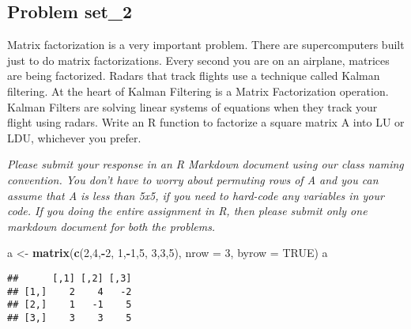 \documentclass[]{article}
\newenvironment{Shaded}{\begin{snugshade}}{\end{snugshade}}
\newcommand{\DataTypeTok}[1]{\textcolor[rgb]{0.13,0.29,0.53}{#1}}
\newcommand{\DecValTok}[1]{\textcolor[rgb]{0.00,0.00,0.81}{#1}}
\newcommand{\KeywordTok}[1]{\textcolor[rgb]{0.13,0.29,0.53}{\textbf{#1}}}
\newcommand{\NormalTok}[1]{#1}
\newcommand{\OperatorTok}[1]{\textcolor[rgb]{0.81,0.36,0.00}{\textbf{#1}}}
\newcommand{\OtherTok}[1]{\textcolor[rgb]{0.56,0.35,0.01}{#1}}
\newcommand{\StringTok}[1]{\textcolor[rgb]{0.31,0.60,0.02}{#1}}
\begin{document}
\hypertarget{problem-set_2}{%
\subsection{Problem set\_2}\label{problem-set_2}}

Matrix factorization is a very important problem. There are
supercomputers built just to do matrix factorizations. Every second you
are on an airplane, matrices are being factorized. Radars that track
flights use a technique called Kalman filtering. At the heart of Kalman
Filtering is a Matrix Factorization operation. Kalman Filters are
solving linear systems of equations when they track your flight using
radars. Write an R function to factorize a square matrix A into LU or
LDU, whichever you prefer.

\emph{Please submit your response in an R Markdown document using our
class naming convention. You don't have to worry about permuting rows of
A and you can assume that A is less than 5x5, if you need to hard-code
any variables in your code. If you doing the entire assignment in R,
then please submit only one markdown document for both the problems.}

\begin{Shaded}
\begin{Highlighting}[]
\NormalTok{a <-}\StringTok{ }\KeywordTok{matrix}\NormalTok{(}\KeywordTok{c}\NormalTok{(}\DecValTok{2}\NormalTok{,}\DecValTok{4}\NormalTok{,}\OperatorTok{-}\DecValTok{2}\NormalTok{,}
              \DecValTok{1}\NormalTok{,}\OperatorTok{-}\DecValTok{1}\NormalTok{,}\DecValTok{5}\NormalTok{,}
              \DecValTok{3}\NormalTok{,}\DecValTok{3}\NormalTok{,}\DecValTok{5}\NormalTok{), }\DataTypeTok{nrow =} \DecValTok{3}\NormalTok{, }\DataTypeTok{byrow =} \OtherTok{TRUE}\NormalTok{)}
\NormalTok{a}
\end{Highlighting}
\end{Shaded}

\begin{verbatim}
##      [,1] [,2] [,3]
## [1,]    2    4   -2
## [2,]    1   -1    5
## [3,]    3    3    5
\end{verbatim}
\end{document}
